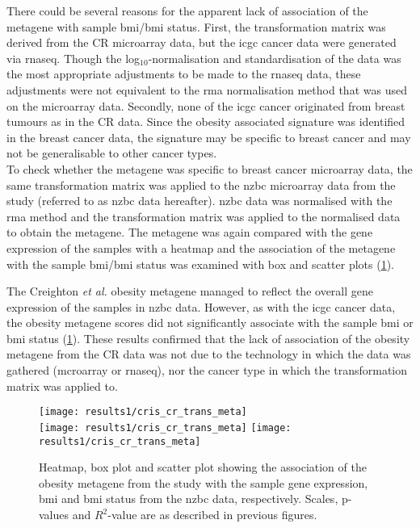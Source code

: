 There could be several reasons for the apparent lack of association of the metagene with sample \gls{bmi}/\gls{bmi} status.
First, the transformation matrix was derived from the CR microarray data, but the \gls{icgc} cancer data were generated via \gls{rnaseq}.
Though the log$_{10}$-normalisation and standardisation of the data was the most appropriate adjustments to be made to the \gls{rnaseq} data, these adjustments were not equivalent to the \gls{rma} normalisation method that was used on the microarray data.
Secondly, none of the \gls{icgc} cancer originated from breast tumours as in the CR data.
Since the obesity associated signature was identified in the breast cancer data, the signature may be specific to breast cancer and may not be generalisable to other cancer types.
\\

\noindent
To check whether the metagene was specific to breast cancer microarray data, the same transformation matrix was applied to the \gls{nzbc} microarray data from the \citet{Print2016} study (referred to as \gls{nzbc} data hereafter).
\gls{nzbc} data was normalised with the \gls{rma} method and the transformation matrix was applied to the normalised data to obtain the metagene.
The metagene was again compared with the gene expression of the samples with a heatmap and the association of the metagene with the sample \gls{bmi}/\gls{bmi} status was examined with box and scatter plots (\cref{fig:crmetaprint}).

The Creighton \textit{et al.} obesity metagene managed to reflect the overall gene expression of the samples in \gls{nzbc}  data.
However, as with the \gls{icgc} cancer data, the obesity metagene scores did not significantly associate with the sample \gls{bmi} or \gls{bmi} status (\cref{fig:crmetaprint}).
These results confirmed that the lack of association of the obesity metagene from the CR data was not due to the technology in which the data was gathered (mcroarray or \gls{rnaseq}), nor the cancer type in which the transformation matrix was applied to.

\begin{figure}[htp!]
	\centering
	\texttt{[image: results1/cris\_cr\_trans\_meta]}\\
	\texttt{[image: results1/cris\_cr\_trans\_meta]}
	\hfill
	\texttt{[image: results1/cris\_cr\_trans\_meta]}
	\caption[Obesity metagene from \citet{Creighton2012} study in the \gls{nzbc} data]{Heatmap, box plot and scatter plot showing the association of the obesity metagene from the \citet{Creighton2012} study with the sample gene expression, \gls{bmi} and \gls{bmi} status from the \gls{nzbc} data, respectively.
	Scales, p-values and $R^2$-value are as described in previous figures.}
	\label{fig:crmetaprint}
\end{figure}

